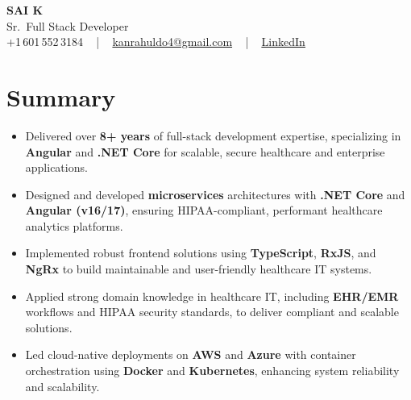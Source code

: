 \documentclass[letterpaper,11pt]{article}
\newcommand{\resumeItem}[1]{
  \item\footnotesize{
    {#1 \vspace{-2pt}}
  }
}
\newcommand{\resumeItemListStart}{\begin{itemize}[leftmargin=*]}
\newcommand{\resumeItemListEnd}{\end{itemize}\vspace{-5pt}}
\begin{document}
\begin{center}
    {\fontsize{14pt}{12pt}\selectfont \textbf{\MakeUppercase{Sai K}}}\\ \vspace{2pt}
    \fontsize{10pt}{12pt}\selectfont Sr.\ Full Stack Developer\\ \vspace{2pt}
    \fontsize{10pt}{12pt}\selectfont +1\,601\,552\,3184 ~ | ~
    \href{mailto:kanrahuldo4@gmail.com}{kanrahuldo4@gmail.com} ~ | ~
    \href{https://www.linkedin.com/in/srrrk/}{\color{blue}\underline{LinkedIn}}
    \vspace{-10pt}
\end{center}

\section{Summary}
\fontsize{9pt}{10pt}\selectfont
\resumeItemListStart
  \resumeItem{Delivered over \textbf{8+ years} of full-stack development expertise, specializing in \textbf{Angular} and \textbf{.NET Core} for scalable, secure healthcare and enterprise applications.}
  \resumeItem{Designed and developed \textbf{microservices} architectures with \textbf{.NET Core} and \textbf{Angular (v16/17)}, ensuring HIPAA-compliant, performant healthcare analytics platforms.}
  \resumeItem{Implemented robust frontend solutions using \textbf{TypeScript}, \textbf{RxJS}, and \textbf{NgRx} to build maintainable and user-friendly healthcare IT systems.}
  \resumeItem{Applied strong domain knowledge in healthcare IT, including \textbf{EHR/EMR} workflows and HIPAA security standards, to deliver compliant and scalable solutions.}
  \resumeItem{Led cloud-native deployments on \textbf{AWS} and \textbf{Azure} with container orchestration using \textbf{Docker} and \textbf{Kubernetes}, enhancing system reliability and scalability.}
\resumeItemListEnd
\vspace{-6pt}

\end{document}

